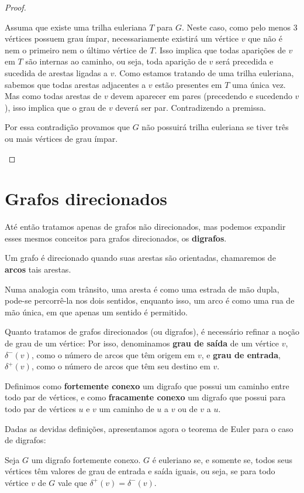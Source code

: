 \begin{proof}
\begin{enumerate}
			Assuma que existe uma trilha euleriana $T$ para $G$. 
			Neste caso, como pelo menos 3 vértices possuem grau ímpar, necessariamente existirá um vértice $v$ que não é nem o primeiro nem o último vértice de $T$.
			Isso implica que todas aparições de $v$ em $T$ são internas ao caminho, ou seja, toda aparição de $v$ será precedida e sucedida de arestas ligadas a $v$.
			Como estamos tratando de uma trilha euleriana, sabemos que todas arestas adjacentes a $v$ estão presentes em $T$ uma única vez. 
			Mas como todas arestas de $v$ devem aparecer em pares (precedendo e sucedendo $v$), isso implica que o grau de $v$ deverá ser par.
			Contradizendo a premissa.

			Por essa contradição provamos que $G$ não possuirá trilha euleriana se tiver três ou mais vértices de grau ímpar.
    \end{enumerate}
\end{proof}

\section{Grafos direcionados}

Até então tratamos apenas de grafos não direcionados, mas podemos expandir esses mesmos conceitos para grafos direcionados, os \textbf{digrafos}.

Um grafo é direcionado quando suas arestas são orientadas, chamaremos de \textbf{arcos} tais arestas. 

Numa analogia com trânsito, uma aresta é como uma estrada de mão dupla, pode-se percorrê-la nos dois sentidos, enquanto isso, um arco é como uma rua de mão única, em que apenas um sentido é permitido.

Quanto tratamos de grafos direcionados (ou digrafos), é necessário refinar a noção de grau de um vértice:
Por isso, denominamos \textbf{grau de saída} de um vértice $v$, $\delta^-(v)$, como o número de arcos que têm origem em $v$, e \textbf{grau de entrada}, $\delta^+(v)$, como o número de arcos que têm seu destino em $v$. 

Definimos como \textbf{fortemente conexo} um digrafo que possui um caminho entre todo par de vértices, e como \textbf{fracamente conexo} um digrafo que possui para todo par de vértices $u$ e $v$ um caminho de $u$ a $v$ ou de $v$ a $u$.

Dadas as devidas definições, apresentamos agora o teorema de Euler para o caso de digrafos:

\begin{theorem}

    Seja $G$ um digrafo fortemente conexo.
$G$ é euleriano se, e somente se, todos seus vértices têm valores de grau de entrada e saída iguais, ou seja, se para todo vértice $v$ de $G$ vale que $\delta^+(v) = \delta^-(v)$.
\label{euler-digraph}
\end{theorem}


